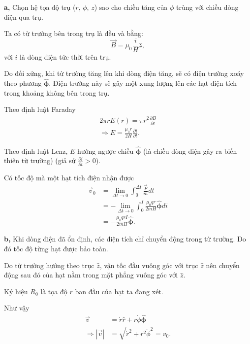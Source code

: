 \textbf{a,} Chọn hệ tọa độ trụ ($r$, $\phi$, $z$) sao cho chiều tăng của $\phi$ trùng với chiều dòng điện qua trụ.

Ta có từ trường bên trong trụ là đều và bằng:
\begin{equation} \label{eq1_p3_d2}
\vec{B} = \mu_0 \frac{i}{H} \hat{z},
\end{equation}
với $i$ là dòng điện tức thời trên trụ.

Do đối xứng, khi từ trường tăng lên khi dòng điện tăng, sẽ có điện trường xoáy theo phương $\hat{\boldsymbol{\phi}}$. 
Điện trường này sẽ gây một xung lượng lên các hạt điện tích trong khoảng không bên trong trụ.

Theo định luật Faraday
\begin{equation} \label{eq2_p3_d2}
\begin{split}
2\pi r E(r) = \pi r^2 \frac{\partial B}{\partial t}\\
\Rightarrow E = \frac{\mu_0 r}{2 H} \frac{\partial i}{\partial t}.
\end{split}
\end{equation}

Theo định luật Lenz, $E$ hướng ngược chiều $\hat{\boldsymbol{\phi}}$ (là chiều dòng điện gây ra biến thiên từ trường) (giả sử $\displaystyle \frac{\partial i}{\partial t} > 0$).

Có tốc độ mà một hạt tích điện nhận được
\begin{equation} \label{eq3_p3_d2}
\begin{split}
\vec{v}_0 &= \lim_{\Delta t \to 0} \int_0^{\Delta t} \frac{\vec{F}}{m} dt \\
&= - \lim_{\Delta t \to 0} \int_{0}^{I} \frac{\mu_0 qr}{2mH}\hat{\boldsymbol{\phi}} di\\
&= -\frac{\mu_0 qrI}{2mH}\hat{\boldsymbol{\phi}}.
\end{split}
\end{equation}

\textbf{b,} Khi dòng điện đã ổn định, các điện tích chỉ chuyển động trong từ trường.
Do đó tốc độ từng hạt được bảo toàn.

Do từ trường hướng theo trục $\hat{z}$, vận tốc đầu vuông góc với trục $\hat{z}$ nên chuyển động sau đó của hạt nằm trong mặt phẳng vuông góc với $\hat{z}$.

Ký hiệu $R_0$ là tọa độ $r$ ban đầu của hạt ta đang xét.

Như vậy
\begin{equation} \label{eq4_p3_d2}
\begin{split}
\vec{v} &= \dot{r} \hat{r} + r\dot{\phi} \hat{\boldsymbol{\phi}}\\
\Rightarrow |\vec{v}| &= \sqrt{\dot{r}^2 + r^2 \dot{\phi}^2} = v_0.
\end{split}
\end{equation}

